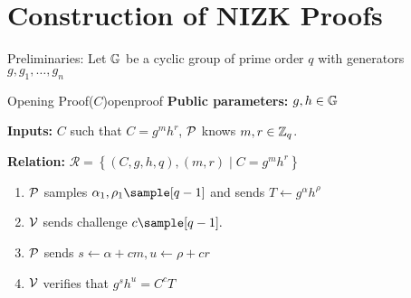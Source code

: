 \section{Construction of NIZK Proofs}





Preliminaries: Let $\mathbb{G}$ be a cyclic group of prime order $q$ with generators $g, g_1, \dots, g_n$


\newpage

\begin{construction}{Opening Proof($C$)}{openproof}
    \vspace{1em}
    \textbf{Public parameters:} $g, h \in \mathbb{G}$

    \textbf{Inputs:} $C$ such that $C = g^mh^r$, $\mathcal{P}$ knows $m, r \in \mathbb{Z}_q$.

    \textbf{Relation:} $\mathcal{R} = \left\{ (C,g,h,q),(m,r) \; | \; C = g^{m}h^r \right\}$
    \vspace{1em}

    \begin{enumerate}
        \item $\mathcal{P}$ samples $\alpha_1, \rho_1 \sample [q-1]$ and sends $T \gets g^{\alpha}h^{\rho}$
        
        \item $\mathcal{V}$ sends challenge $c \sample [q-1].$
    
        \item $\mathcal{P}$ sends $s \gets \alpha + cm, u \gets \rho + cr$
    
        \item $\mathcal{V}$ verifies that $g^{s}h^{u} = C^cT$
    \end{enumerate}
\end{construction}

